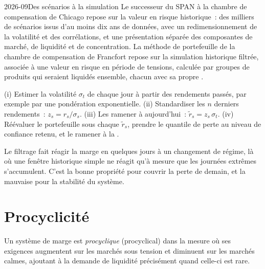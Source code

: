 \begin{dated}{2026-09}{Des scénarios à la simulation}\label{dat:m1:margin:models}
Le successeur du SPAN à la chambre de compensation de Chicago repose sur la valeur en
risque historique~: des milliers de scénarios issus d'au moins dix ans de données, avec un
redimensionnement de la volatilité et des corrélations, et une présentation séparée des
composantes de marché, de liquidité et de concentration. La méthode de portefeuille de la chambre
de compensation de Francfort repose sur la simulation historique filtrée, associée à une
valeur en risque en période de tensions, calculée par groupes de produits qui seraient
liquidés ensemble, chacun avec sa propre .
\end{dated}

\begin{method}\label{met:m1:margin:fhs}
(i) Estimer la volatilité $\sigma_t$ de chaque jour à partir des rendements passés, par
exemple par une pondération exponentielle. (ii) Standardiser les $n$ derniers rendements~:
$z_s = r_s/\sigma_s$. (iii) Les ramener à aujourd'hui~: $\tilde r_s = z_s\,\sigma_t$.
(iv) Réévaluer le portefeuille sous chaque $\tilde r_s$, prendre le quantile de perte au
niveau de confiance retenu, et le ramener à la .
\end{method}

Le filtrage fait réagir la marge en quelques jours à un changement de régime, là où une
fenêtre historique simple ne réagit qu'à mesure que les journées extrêmes s'accumulent. C'est
la bonne propriété pour couvrir la perte de demain, et la mauvaise pour la stabilité du
système.

\section{Procyclicité}

\begin{definition}[Procyclicité]\label{def:m1:margin:procyclical}
Un système de marge est \emph{procyclique} (procyclical) dans la mesure où
ses exigences augmentent sur les marchés sous tension et diminuent sur les marchés calmes,
ajoutant à la demande de liquidité précisément quand celle-ci est rare.
\end{definition}

